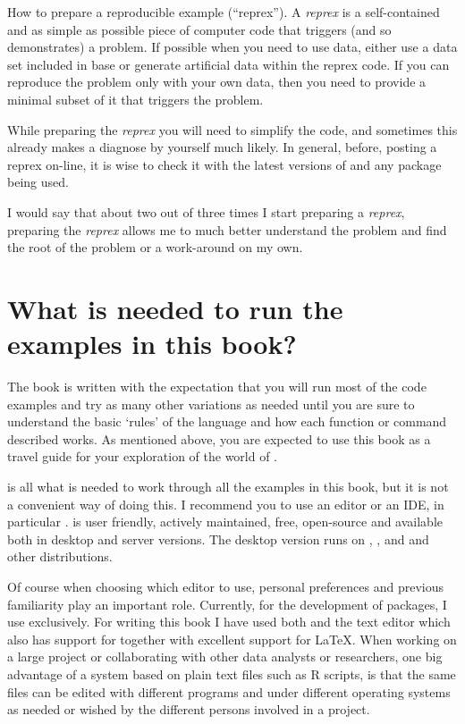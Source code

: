 \documentclass[krantz2]{krantz}\usepackage{knitr}%
\begin{document}
\begin{explainbox}
How to prepare a reproducible example (``reprex''). A \emph{reprex} is a self-contained and as simple as possible piece of computer code that triggers (and so demonstrates) a problem. If possible when you need to use data, either use a data set included in base \Rpgrm or generate artificial data within the reprex code. If you can reproduce the problem only with your own data, then you need to provide a minimal subset of it that triggers the problem.

While preparing the \emph{reprex} you will need to simplify the code, and sometimes this already makes a diagnose by yourself much likely. In general, before, posting a reprex on-line, it is wise to check it with the latest versions of \Rpgrm and any package being used.

I would say that about two out of three times I start preparing a \emph{reprex}, preparing the \emph{reprex} allows me to much better understand the problem and find the root of the problem or a work-around on my own.
\end{explainbox}

\section{What is needed to run the examples in this book?}

The book is written with the expectation that you will run most of the code examples and try as many other variations as needed until you are sure to understand the basic `rules' of the \Rpgrm language and how each function or command described works. As mentioned above, you are expected to use this book as a travel guide for your exploration of the world of \Rlang.

\Rpgrm is all what is needed to work through all the examples in this book, but it is not a convenient way of doing this. I recommend you to use an editor or an IDE, in particular \RStudio{}. \RStudio is user friendly, actively maintained, free, open-source and available both in desktop and server versions. The desktop version runs on , , and  and other  distributions.

Of course when choosing which editor to use, personal preferences and previous familiarity play an important role.
Currently, for the development of packages, I use \RStudio exclusively. For writing this book I have used both \RStudio and the text editor  which also has support for \Rpgrm together with excellent support for \LaTeX{}. When working on a large project or collaborating with other data analysts or researchers, one big advantage of a system based on plain text files such as R scripts, is that the same files can be edited with different programs and under different operating systems as needed or wished by the different persons involved in a project.
\end{document}
